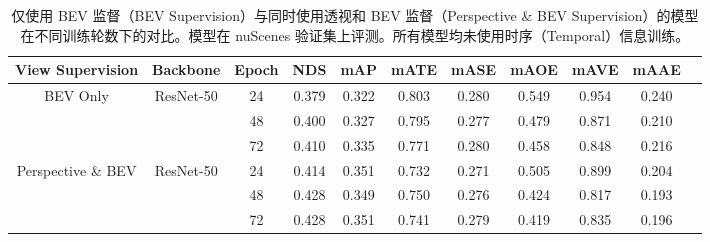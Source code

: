 \setlength{\tabcolsep}{3pt}
\setlength{\doublerulesep}{2\arrayrulewidth}
\renewcommand{\arraystretch}{1.1}
\begin{table}[t]
    \caption{仅使用 BEV 监督（BEV Supervision）与同时使用透视和 BEV 监督（Perspective \& BEV Supervision）的模型在不同训练轮数下的对比。模型在 nuScenes 验证集上评测。所有模型均未使用时序（Temporal）信息训练。}
    \label{table:long_schedule}
    \centering

    \begin{tabular}{c|c|c|cc|cccccc}
        \toprule
        View Supervision & Backbone & Epoch  & NDS & mAP & mATE & mASE & mAOE & mAVE & mAAE   \\ 
        \midrule 
        \multirow{3}{*}{BEV Only} & \multirow{3}{*}{ResNet-50} & 24 & 0.379 & 0.322 & 0.803 & 0.280 & 0.549 & 0.954 & 0.240 \\ 
         &  & 48 & 0.400 & 0.327 & 0.795 & 0.277 & 0.479 & 0.871 & 0.210 \\ 
         &  & 72 & 0.410 & 0.335 & 0.771 & 0.280 & 0.458 & 0.848 & 0.216 \\ 
        \midrule
        \multirow{3}{*}{Perspective \& BEV} & \multirow{3}{*}{ResNet-50} & 24 &  0.414 & 0.351 & 0.732 & 0.271 & 0.505 & 0.899 & 0.204 \\ 
         &  & 48 & 0.428 & 0.349 & 0.750 & 0.276 & 0.424 & 0.817 & 0.193 \\ 
         &  & 72 & 0.428 & 0.351 & 0.741 & 0.279 & 0.419 & 0.835 & 0.196 \\ 
        \midrule
        \bottomrule
    \end{tabular}
\end{table}